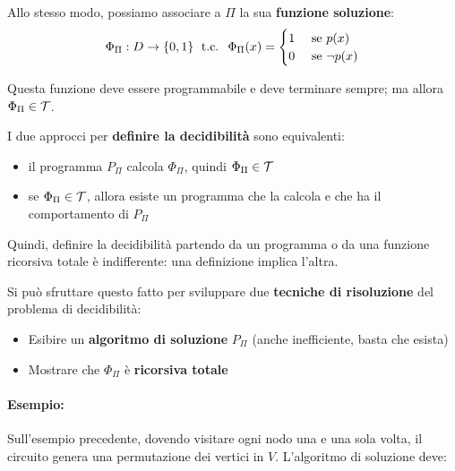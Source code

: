 Allo stesso modo, possiamo associare a $\Pi$ la sua \textbf{funzione soluzione}:
$$ \Phi_\Pi : D \rightarrow \{0,1\} \; \text{ t.c. } \; \Phi_\Pi (x) = \begin{cases}
	1 & \text{ se } p(x) \\
	0 & \text{ se } \neg p(x)
\end{cases}$$

Questa funzione deve essere programmabile e deve terminare sempre; ma allora $\Phi_\Pi \in \mathcal{T}$.

I due approcci per \textbf{definire la decidibilità} sono equivalenti:
\begin{itemize}
	\item il programma $P_\Pi$ calcola $\Phi_\Pi$, quindi $\Phi_\Pi \in \mathcal{T}$
	\item se $\Phi_\Pi \in \mathcal{T}$, allora esiste un programma che la calcola e che ha il comportamento di $P_\Pi$
\end{itemize}

Quindi, definire la decidibilità partendo da un programma o da una funzione ricorsiva totale è indifferente: una definizione implica l'altra.

Si può sfruttare questo fatto per sviluppare due \textbf{tecniche di risoluzione} del problema di decidibilità:
\begin{itemize}
	\item Esibire un \textbf{algoritmo di soluzione} $P_\Pi$ (anche inefficiente, basta che esista)
	\item Mostrare che $\Phi_\Pi$ è \textbf{ricorsiva totale}
\end{itemize}

\paragraph{Esempio:} Sull'esempio precedente, dovendo visitare ogni nodo una e una sola volta, il circuito genera una permutazione dei vertici in $V$. L'algoritmo di soluzione deve:
 

\vspace{-0.25em}

